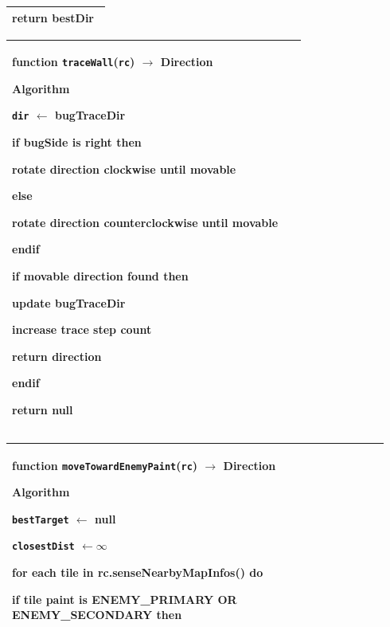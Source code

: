 \documentclass{article}
\newenvironment{pseudobox}
{
\centering
\begin{longtable}{|p{0.94\linewidth}|}
\hline
}
{
\\ \hline
\end{longtable}
\vspace{0.05cm}
}
\begin{document}
\begin{enumerate}[label=\alph*.]
\begin{pseudobox}
\hspace*{1.5em}return bestDir
\end{pseudobox}

\begin{pseudobox}
\textbf{function \texttt{traceWall}(\texttt{rc}) $\rightarrow$ Direction}

\textbf{Algorithm}

\hspace*{1.5em}\texttt{dir} $\leftarrow$ bugTraceDir

\hspace*{1.5em}if bugSide is right then

\hspace*{3em}rotate direction clockwise until movable

\hspace*{1.5em}else

\hspace*{3em}rotate direction counterclockwise until movable

\hspace*{1.5em}endif

\hspace*{1.5em}if movable direction found then

\hspace*{3em}update bugTraceDir

\hspace*{3em}increase trace step count

\hspace*{3em}return direction

\hspace*{1.5em}endif

\hspace*{1.5em}return null

\end{pseudobox}

\begin{pseudobox}
\textbf{function \texttt{moveTowardEnemyPaint}(\texttt{rc}) $\rightarrow$ Direction}

\textbf{Algorithm}

\hspace*{1.5em}\texttt{bestTarget} $\leftarrow$ null

\hspace*{1.5em}\texttt{closestDist} $\leftarrow \infty$

\hspace*{1.5em}for each tile in rc.senseNearbyMapInfos() do

\hspace*{3em}if tile paint is ENEMY\_PRIMARY OR ENEMY\_SECONDARY then


\end{pseudobox}
\end{enumerate}
\end{document}
